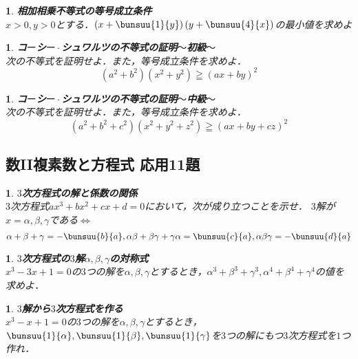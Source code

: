 \documentclass[10pt,
fleqn,
dvipdfmx,
uplatex
]{jsarticle}
\newtheorem{question}[Question]{}
\begin{document}
\begin{question}{\bf\boldmath 相加相乗不等式の等号成立条件}\\
$x>0, y>0$とする．$\left(x+\bunsuu{1}{y}\right)\left(y+\bunsuu{4}{x}\right)$の最小値を求めよ
\end{question}



\begin{question}{\bf\boldmath コ$ー$シ$ー\cdot$シュワルツの不等式の証明$〜$初級$〜$}\\
次の不等式を証明せよ．また，等号成立条件を求めよ．
\[\left(a^2+b^2\right)\left(x^2+y^2\right)\geqq \left(ax+by\right)^2\]
\end{question}



\begin{question}{\bf\boldmath コ$ー$シ$ー\cdot$シュワルツの不等式の証明$〜$中級$〜$}\\
次の不等式を証明せよ．また，等号成立条件を求めよ．
\[\left(a^2+b^2+c^2\right)\left(x^2+y^2+z^2\right)\geqq \left(ax+by+cz\right)^2\]
\end{question}

\subsection{数II複素数と方程式 応用11題}



\begin{question}{\bf\boldmath $3$次方程式の解と係数の関係}\\
$3$次方程式$ax^3+bx^2+cx+d=0$において，次が成り立つことを示せ．
$3$解が$x=\alpha , \beta , \gamma$である$⇔$
\[\alpha +\beta +\gamma=-\bunsuu{b}{a}, \alpha \beta +\beta \gamma+\gamma\alpha =\bunsuu{c}{a}, \alpha \beta \gamma=-\bunsuu{d}{a}\]
\end{question}



\begin{question}{\bf\boldmath $3$次方程式の$3$解$\alpha ,\beta ,\gamma$の対称式}\\
$x^3-3x+1=0$の$3$つの解を$\alpha , \beta , \gamma$とするとき，$\alpha ^3+\beta ^3+\gamma^3, \alpha ^4+\beta ^4+\gamma^4$の値を求めよ．
\end{question}



\begin{question}{\bf\boldmath $3$解から$3$次方程式を作る}\\
$x^3-x+1=0$の$3$つの解を$\alpha , \beta , \gamma$とするとき，$\bunsuu{1}{\alpha }, \bunsuu{1}{\beta }, \bunsuu{1}{\gamma}$を$3$つの解にもつ$3$次方程式を$1$つ作れ．
\end{question}
\end{document}
